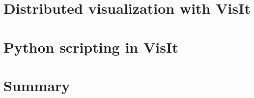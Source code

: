 \documentclass[xcolor=svgnames]{beamer}
\providecommand{\sectionpage}{\Large\centering \bf\mediumblue\insertsection}
\begin{document}
\section{Distributed visualization with VisIt}
\frame{\sectionpage}

\section{Python scripting in VisIt}
\frame{\sectionpage}

\section{Summary}
\frame{\sectionpage}

\end{document}
